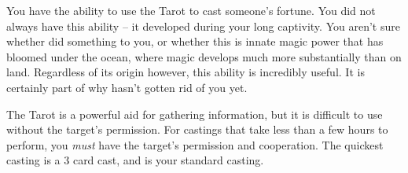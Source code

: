 \documentclass[green]{NeptuneBall}
\begin{document}
\name{\gTarot{}}


You have the ability to use the Tarot to cast someone's fortune. You did not always have this ability -- it developed during your long captivity. You aren't sure whether \cWitch{} did something to you, or whether this is innate magic power that has bloomed under the ocean, where magic develops much more substantially than on land. Regardless of its origin however, this ability is incredibly useful. It is certainly part of why \cWitch{} hasn't gotten rid of you yet.

The Tarot is a powerful aid for gathering information, but it is difficult to use without the target's permission. For castings that take less than a few hours to perform, you \emph{must} have the target's permission and cooperation. The quickest casting is a 3 card cast, and is your standard casting.\\
\end{document}
